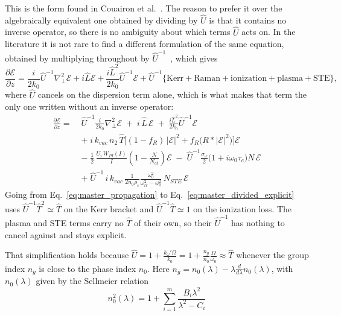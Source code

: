 This is the form found in Couairon et al.~\cite{PhysRevB.71.125435}. The reason to prefer it over the algebraically equivalent one obtained by dividing by $\hat{U}$ is that it contains no inverse operator, so there is no ambiguity about which terms $\hat{U}$ acts on.
In the literature it is not rare to find a different formulation of the same equation, obtained by multiplying throughout by $\hat{U}^{-1}$~\cite{chowdhury2005,wu2005femtosecond}, which gives
\begin{equation}
\label{eq:master_divided}
\frac{\partial \mathcal{E}}{\partial z} = \frac{i}{2k_0}\hat{U}^{-1}\nabla_\perp^2 \mathcal{E} + i\hat{L}\mathcal{E} + \frac{i\hat{L}^2}{2k_0}\hat{U}^{-1}\mathcal{E}
 + \hat{U}^{-1}\Big\{\text{Kerr} + \text{Raman} + \text{ionization} + \text{plasma} + \text{STE}\Big\},
\end{equation}
where $\hat{U}$ cancels on the dispersion term alone, which is what makes that term the only one written without an inverse operator:
\begin{align}
\label{eq:master_divided_explicit}
\frac{\partial \mathcal{E}}{\partial z} =\;
&\hat{U}^{-1}\frac{i}{2k_0}\nabla_\perp^2 \mathcal{E}
\;+\;
i\,\hat{L}\,\mathcal{E}
\;+\;
\frac{i\hat{L}^2}{2k_0}\hat{U}^{-1}\mathcal{E} \nonumber\\[4pt]
&+\;i\,k_{vac}\,n_2\,\hat{T}\Big[(1-f_R)\,|\mathcal{E}|^2 + f_R\big(R * |\mathcal{E}|^2\big)\Big]\mathcal{E} \nonumber\\[4pt]
&-\;\frac{1}{2}\,\frac{U_i\,W_{PI}(I)}{I}\left(1-\frac{N}{N_{at}}\right)\mathcal{E}
\;-\;\hat{U}^{-1}\frac{\sigma_\omega}{2}\big(1+i\omega_0\tau_c\big)N\,\mathcal{E} \nonumber\\[4pt]
&+\;\hat{U}^{-1}\,i\,k_{vac}\,\frac{1}{2n_0\rho_c}\frac{\omega_0^2}{\omega_{tr}^2-\omega_0^2}\,N_{STE}\,\mathcal{E}
\end{align}
Going from Eq.~\eqref{eq:master_propagation} to Eq.~\eqref{eq:master_divided_explicit} uses $\hat{U}^{-1}\hat{T}^2\simeq\hat{T}$ on the Kerr bracket and $\hat{U}^{-1}\hat{T}\simeq1$ on the ionization loss. The plasma and STE terms carry no $\hat{T}$ of their own, so their $\hat{U}^{-1}$ has nothing to cancel against and stays explicit.

\noindent That simplification holds because $\hat{U} = 1 + \frac{k_{\omega}'\Omega}{k_0} = 1 + \frac{n_g}{n_0}\frac{\Omega}{\omega_0}\approx\hat{T}$ whenever the group index $n_g$ is close to the phase index $n_0$. Here $n_g = n_0(\lambda) - \lambda \frac{d}{d\lambda}n_0(\lambda)$, with $n_0(\lambda)$ given by the Sellmeier relation $$n_0^2(\lambda) = 1 + \sum_{i=1}^{m} \frac{B_i \lambda^2}{\lambda^2 - C_i}$$

